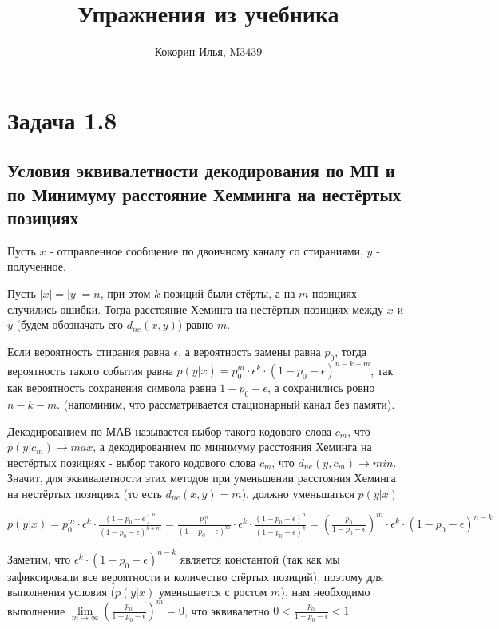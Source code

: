 \documentclass{article}
\title{Упражнения из учебника}
\author{Кокорин Илья, M3439}
\begin{document}
	\maketitle
	
	\section{Задача 1.8}
	
	\subsection{Условия эквивалетности декодирования по МП и по Минимуму расстояние Хемминга на нестёртых позициях}
	
	Пусть $x$ - отправленное сообщение по двоичному каналу со стираниями, $y$ - полученное.
	
	Пусть $|x| = |y| = n$, при этом $k$ позиций были стёрты, а на $m$ позициях случились ошибки. Тогда расстояние Хеминга на нестёртых позициях между $x$ и $y$ (будем обозначать его $d_{ne}(x, y)$) равно $m$.
	
	Если вероятность стирания равна $\epsilon$, а вероятность замены равна $p_0$, тогда вероятность такого события равна $p(y|x) = p_0^m \cdot \epsilon^k \cdot (1 - p_0 -\epsilon)^{n - k - m}$, так как вероятность сохранения символа равна $1 - p_0 - \epsilon$, а сохранились ровно $n - k - m$. (напоминим, что рассматривается стационарный канал без памяти).
	
	Декодированием по МАВ называется выбор такого кодового слова $c_m$, что $p(y|c_m) \rightarrow max$, а декодированием по минимуму расстояния Хеминга на нестёртых позициях - выбор такого кодового слова $c_m$, что $d_{ne}(y, c_m) \rightarrow min$. Значит, для эквивалетности этих методов при уменьшении расстояния Хеминга на нестёртых позициях (то есть $d_{ne}(x, y) = m$), должно уменьшаться $p(y|x)$
	
	$p(y|x) = p_0^m \cdot \epsilon^k \cdot \frac{(1 - p_0 -\epsilon)^n}{(1 - p_0 -\epsilon)^{k + m}} = \frac{p_0^m}{(1 - p_0 -\epsilon)^m} \cdot \epsilon^k \cdot \frac{(1 - p_0 -\epsilon)^n}{(1 - p_0 -\epsilon)^k} = (\frac{p_0}{1 - p_0 - \epsilon})^m \cdot \epsilon^k \cdot (1 - p_0 -\epsilon)^{n - k}$
	
	Заметим, что $\epsilon^k \cdot (1 - p_0 -\epsilon)^{n - k}$ является константой (так как мы зафиксировали все вероятности и количество стёртых позиций), поэтому для выполнения условия ($p(y|x)$ уменьшается с ростом $m$), нам необходимо выполнение $\lim\limits_{m \rightarrow \infty} (\frac{p_0}{1 - p_0 - \epsilon})^m = 0$, что эквивалетно $0 < \frac{p_0}{1 - p_0 - \epsilon} < 1$
	
\end{document}

